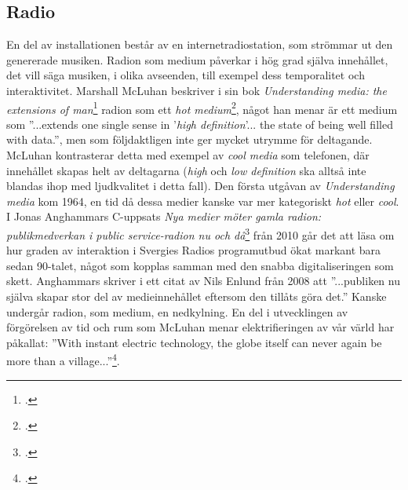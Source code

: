 \documentclass[11pt, a4paper]{article} %
\begin{document}


\subsection*{Radio}
En del av installationen består av en internetradiostation, som strömmar ut den genererade musiken. Radion som medium påverkar i hög grad själva innehållet, det vill säga musiken, i olika avseenden, till exempel dess temporalitet och interaktivitet. 
Marshall McLuhan beskriver i sin bok \emph{Understanding media: the extensions of man}\footcite{mcluhan_understanding_2003} radion som ett \emph{hot medium}\footcite[39]{mcluhan_understanding_2003}, något han menar är ett medium som ''...extends one single sense in '\emph{high definition}'... the state of being well filled with data.'', men som följdaktligen inte ger mycket utrymme för deltagande. McLuhan kontrasterar detta med exempel av \emph{cool media} som telefonen, där innehållet skapas helt av deltagarna (\emph{high} och \emph{low definition} ska alltså inte blandas ihop med ljudkvalitet i detta fall). Den första utgåvan av \emph{Understanding media} kom 1964, en tid då dessa medier kanske var mer kategoriskt \emph{hot} eller \emph{cool}. I Jonas Anghammars C-uppsats \emph{Nya medier möter gamla radion: publikmedverkan i public service-radion nu och då}\footcite{anghammar_nya_2010} från 2010 går det att läsa om hur graden av interaktion i Svergies Radios programutbud ökat markant bara sedan 90-talet, något som kopplas samman med den snabba digitaliseringen som skett. Anghammars skriver i ett citat av Nils Enlund från 2008 att ''...publiken nu själva skapar stor del av medieinnehållet eftersom den tillåts göra det.'' Kanske undergår radion, som medium, en nedkylning. En del i utvecklingen av förgörelsen av tid och rum som McLuhan menar elektrifieringen av vår värld har påkallat: ''With instant electric technology, the globe itself can never again be more than a village...''\footcite[454]{mcluhan_understanding_2003}.


\end{document}
